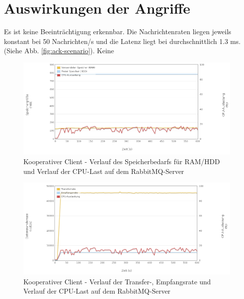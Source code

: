 \documentclass[	a4paper,
			11pt,
			titlepage,
			oneside,
			fleqn,
			listof=totoc,
			parskip,
			numbers=noenddot]{scrartcl}
\begin{document}
%	
%
\clearpage
\section*{Auswirkungen der Angriffe}
	
		{%
		  \newline
		  \newline
		  \newline
		}{%
		 Es ist keine Beeinträchtigung erkennbar. Die Nachrichtenraten liegen jeweils konstant bei 50 Nachrichten/s und die Latenz liegt bei durchschnittlich 1.3 ms.
		 (Siehe Abb. \ref{fig:ack-scenario}).
		}{%
		 Keine
		}
		
		\begin{figure}[!htb]
			\centering
			\includegraphics[width=\textwidth]{img/ack/ack_server1.png}
			\caption{Kooperativer Client - Verlauf des Speicherbedarfs für RAM/HDD und Verlauf der CPU-Last auf dem RabbitMQ-Server}
			\label{fig:ack-server1}
		\end{figure}
		
		\begin{figure}[!htb]
			\centering
			\includegraphics[width=\textwidth]{img/ack/ack_server2.png}
			\caption{Kooperativer Client - Verlauf der Transfer-, Empfangsrate und Verlauf der CPU-Last auf dem RabbitMQ-Server}
			\label{fig:ack-server2}
		\end{figure}
		
\end{document}
